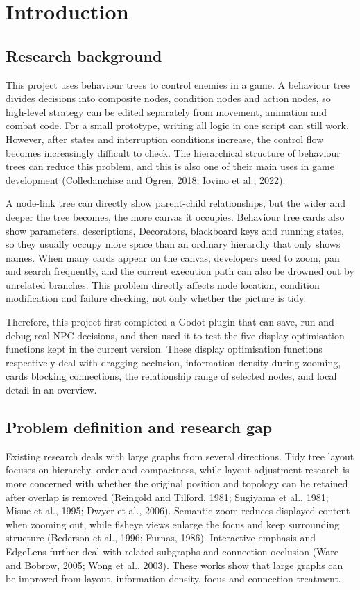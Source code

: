 \chapter{Introduction}

\section{Research background}

This project uses behaviour trees to control enemies in a game. A behaviour tree divides decisions into composite nodes, condition nodes and action nodes, so high-level strategy can be edited separately from movement, animation and combat code. For a small prototype, writing all logic in one script can still work. However, after states and interruption conditions increase, the control flow becomes increasingly difficult to check. The hierarchical structure of behaviour trees can reduce this problem, and this is also one of their main uses in game development (Colledanchise and Ögren, 2018; Iovino et al., 2022).

A node-link tree can directly show parent-child relationships, but the wider and deeper the tree becomes, the more canvas it occupies. Behaviour tree cards also show parameters, descriptions, Decorators, blackboard keys and running states, so they usually occupy more space than an ordinary hierarchy that only shows names. When many cards appear on the canvas, developers need to zoom, pan and search frequently, and the current execution path can also be drowned out by unrelated branches. This problem directly affects node location, condition modification and failure checking, not only whether the picture is tidy.

Therefore, this project first completed a Godot plugin that can save, run and debug real NPC decisions, and then used it to test the five display optimisation functions kept in the current version. These display optimisation functions respectively deal with dragging occlusion, information density during zooming, cards blocking connections, the relationship range of selected nodes, and local detail in an overview.

\section{Problem definition and research gap}

Existing research deals with large graphs from several directions. Tidy tree layout focuses on hierarchy, order and compactness, while layout adjustment research is more concerned with whether the original position and topology can be retained after overlap is removed (Reingold and Tilford, 1981; Sugiyama et al., 1981; Misue et al., 1995; Dwyer et al., 2006). Semantic zoom reduces displayed content when zooming out, while fisheye views enlarge the focus and keep surrounding structure (Bederson et al., 1996; Furnas, 1986). Interactive emphasis and EdgeLens further deal with related subgraphs and connection occlusion (Ware and Bobrow, 2005; Wong et al., 2003). These works show that large graphs can be improved from layout, information density, focus and connection treatment.

